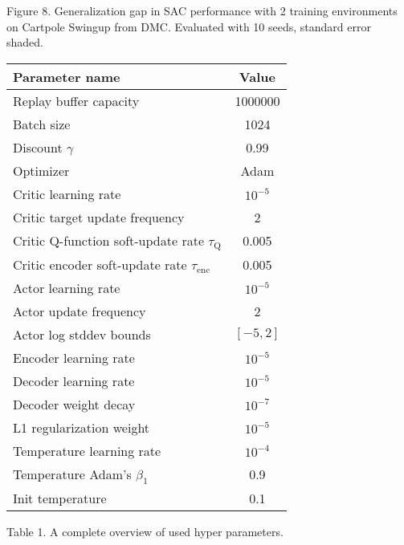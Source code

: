 \documentclass[10pt]{article}
\begin{document}
Figure 8. Generalization gap in SAC performance with 2 training environments on Cartpole Swingup from DMC. Evaluated with 10 seeds, standard error shaded.

\begin{center}
\begin{tabular}{|l|c|}
\hline
Parameter name & Value \\
\hline
Replay buffer capacity & 1000000 \\
Batch size & 1024 \\
Discount $\gamma$ & 0.99 \\
Optimizer & Adam \\
Critic learning rate & $10^{-5}$ \\
Critic target update frequency & 2 \\
Critic Q-function soft-update rate $\tau_{\mathrm{Q}}$ & 0.005 \\
Critic encoder soft-update rate $\tau_{\text {enc }}$ & 0.005 \\
Actor learning rate & $10^{-5}$ \\
Actor update frequency & 2 \\
Actor log stddev bounds & $[-5,2]$ \\
Encoder learning rate & $10^{-5}$ \\
Decoder learning rate & $10^{-5}$ \\
Decoder weight decay & $10^{-7}$ \\
L1 regularization weight & $10^{-5}$ \\
Temperature learning rate & $10^{-4}$ \\
Temperature Adam's $\beta_{1}$ & 0.9 \\
Init temperature & 0.1 \\
\hline
\end{tabular}
\end{center}

Table 1. A complete overview of used hyper parameters.
\end{document}
